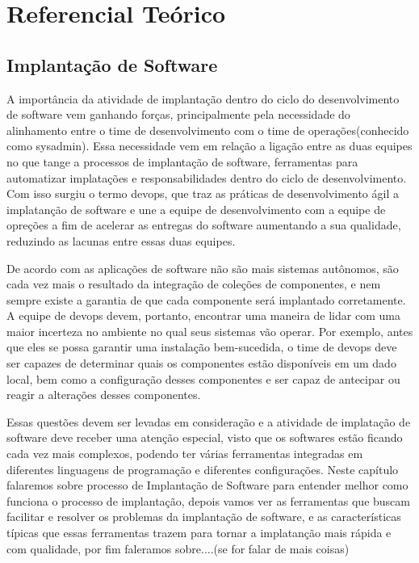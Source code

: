 \chapter{Referencial Teórico}
\label{cap-implantacao}

\section{Implantação de Software}

A importância da atividade de implantação dentro do ciclo do desenvolvimento
de software vem ganhando forças, principalmente pela necessidade do alinhamento
entre o time de desenvolvimento com o time de operações(conhecido como sysadmin).
Essa necessidade vem em relação a ligação entre as duas equipes no que tange a
processos de implantação de software, ferramentas para automatizar implatações
e responsabilidades dentro do ciclo de desenvolvimento. Com isso surgiu o termo devops, que
traz as práticas de desenvolvimento ágil a implatanção de software e une a equipe de desenvolvimento
com a equipe de opreções a fim de acelerar as entregas do software aumentando
a sua qualidade, reduzindo as lacunas entre essas duas equipes.

De acordo com \cite{deployment1998} as aplicações de software não são mais
sistemas autônomos, são cada vez mais o resultado da integração de coleções de
componentes, e nem sempre existe a garantia de que cada componente será implantado
corretamente. A equipe de devops devem, portanto, encontrar uma maneira de lidar
com uma maior incerteza no ambiente no qual seus sistemas vão operar.
Por exemplo, antes que eles se possa garantir uma instalação bem-sucedida, o time
de devops deve ser capazes de determinar quais os componentes estão disponíveis
 em um dado local, bem como a configuração desses componentes e ser capaz de
antecipar ou reagir a alterações desses componentes.

Essas questões  devem ser levadas em consideração e a atividade de implatação de
software deve receber uma atenção especial, visto que os softwares estão ficando
cada vez mais complexos, podendo ter várias ferramentas integradas em diferentes
linguagens de programação e diferentes configurações. Neste capítulo falaremos
sobre processo de Implantação de Software
para entender melhor como funciona o processo de implantação, depois vamos ver as
ferramentas que buscam facilitar  e resolver os problemas da implantação de software,
e as características típicas que essas ferramentas trazem para tornar a implatanção
mais rápida e com qualidade, por fim faleramos sobre....(se for falar de mais coisas)

